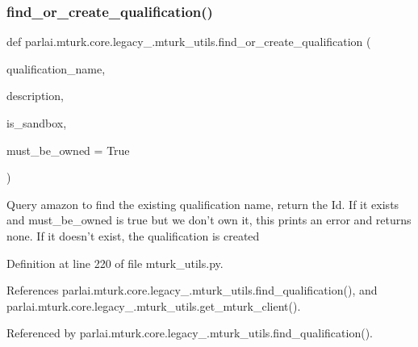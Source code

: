 \subsubsection{\texorpdfstring{find\+\_\+or\+\_\+create\+\_\+qualification()}{find\_or\_create\_qualification()}}
{\footnotesize\ttfamily def parlai.\+mturk.\+core.\+legacy\+\_.\+mturk\+\_\+utils.\+find\+\_\+or\+\_\+create\+\_\+qualification (\begin{DoxyParamCaption}\item[{}]{qualification\+\_\+name,  }\item[{}]{description,  }\item[{}]{is\+\_\+sandbox,  }\item[{}]{must\+\_\+be\+\_\+owned = {\ttfamily True} }\end{DoxyParamCaption})}

\begin{DoxyVerb}Query amazon to find the existing qualification name, return the Id. If
it exists and must_be_owned is true but we don't own it, this prints an
error and returns none. If it doesn't exist, the qualification is created
\end{DoxyVerb}
 

Definition at line 220 of file mturk\+\_\+utils.\+py.



References parlai.\+mturk.\+core.\+legacy\+\_.\+mturk\+\_\+utils.\+find\+\_\+qualification(), and parlai.\+mturk.\+core.\+legacy\+\_.\+mturk\+\_\+utils.\+get\+\_\+mturk\+\_\+client().



Referenced by parlai.\+mturk.\+core.\+legacy\+\_.\+mturk\+\_\+utils.\+find\+\_\+qualification().

